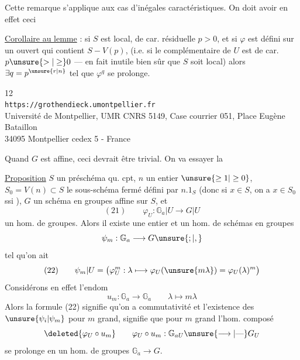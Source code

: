 Cette remarque s'applique aux cas d'inégales caractéristiques. On doit avoir en effet ceci

\uline{Corollaire au lemme}  : si $S$ est local, de car. résiduelle $p>0$, et si $\varphi$ est défini sur un ouvert qui contient $S-V(p)$, (i.e. si le complémentaire de $U$ est de car. $p\unsure{>|\geq}0$ --- en fait inutile bien sûr que $S$ soit local) alors $\exists q=p^{\unsure{r|n}}$ tel que $\varphi^q$ se prolonge.

\begin{center}
\small
12\\
\texttt{https://grothendieck.umontpellier.fr}\\
Université de Montpellier, UMR CNRS 5149, Case courrier 051, Place Eugène Bataillon\\
34095 Montpellier cedex 5 - France
\end{center}
Quand $G$ est affine, ceci devrait être trivial. On va essayer la

\uline{Proposition}  $S$ un préschéma qu. cpt, $n$ un entier $\unsure{\geq1|\geq0}$,  $S_0=V(n)\subset S$ le sous-schéma fermé défini par $n.1_S$ (donc si $x\in S$, on a $x\in S_0$ ssi   ),  $G$ un schéma en groupes affine  sur $S$, et
\[
(21)\qquad\varphi_U:\mathbb G_a|U\longrightarrow G|U
\]
un hom. de groupes.  Alors il existe une  entier    et un hom. de schémas en groupes
\[
\psi_m:\mathbb G_a\longrightarrow G\unsure{;|,}
\]
tel qu'on ait
\[
(22)\qquad\psi_m|U=\bigl(\varphi_U^m:\lambda\longmapsto\varphi_U(\unsure{m\lambda})=\varphi_U(\lambda)^m\bigr)
\]
Considérons en effet l'endom
\[
u_m:\mathbb G_a\longrightarrow\mathbb G_a\qquad\lambda\longmapsto m\lambda
\]
Alors la formule (22) signifie qu'on a commutativité
et l'existence des $\unsure{\psi_i|\psi_m}$ pour $m$ grand, signifie que pour $m$ grand l'hom. composé
\[
\deleted{\varphi_U\circ u_m}\qquad\varphi_U\circ u_m:\mathbb G_{aU}\unsure{\longrightarrow|\text{---}}G_U
\]
se prolonge en un hom. de groupes $\mathbb G_a\longrightarrow G$.

